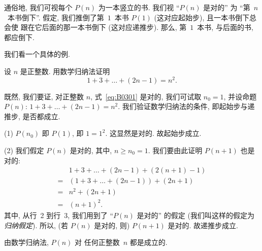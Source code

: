 \documentclass[../libro.tex]{subfiles}
\begin{document}
通俗地, 我们可视每个 \(P(n)\) 为一本竖立的书.
我们视 ``\(P(n)\) 是对的'' 为
``第~\(n\)~本书倒下''.
假定, 我们推倒了第~\(1\)~本书 \(P(1)\) (这对应起始步),
且一本书倒下总会使%
跟在它后面的那一本书倒下 (这对应递推步).
那么, 第~\(1\)~本书, 与后面的书,
都应倒下.

\vspace{2ex}

我们看一个具体的例.

\begin{example}
    设 \(n\) 是正整数.
    用数学归纳法证明
    \begin{equation}
        1 + 3 + \dots + (2n - 1) = n^2.
        \label{eq:B0301}
    \end{equation}

    既然, 我们要证, 对正整数 \(n\),
    式~\eqref{eq:B0301} 是对的,
    我们可试取 \(n_0 = 1\),
    并设命题 \(P(n)\): \(1 + 3 + \dots + (2n - 1) = n^2\).
    我们验证数学归纳法的条件,
    即起始步与递推步,
    是否都成立.

    (1)
    \(P(n_0)\) 即 \(P(1)\), 即 \(1 = 1^2\).
    这显然是对的.
    故起始步成立.

    (2)
    我们假定 \(P(n)\) 是对的, 其中, \(n \geq n_0 = 1\).
    我们要由此证明 \(P(n+1)\) 也是对的:
    \begin{align*}
        & 1 + 3 + \dots + (2n - 1) + (2(n+1) - 1)
        \\
        = {} & (1 + 3 + \dots + (2n - 1)) + (2n + 1)
        \\
        = {} & n^2 + (2n + 1)
        \\
        = {} & (n + 1)^2.
    \end{align*}
    其中, 从行~2 到行~3,
    我们用到了 ``\(P(n)\) 是对的'' 的假定
    (我们叫这样的假定为\emph{归纳假定}).
    所以, (若 \(P(n)\) 是对的, 则) \(P(n+1)\) 是对的.
    故递推步成立.

    由数学归纳法, \(P(n)\) 对%
    任何正整数~\(n\) 都是成立的.
\end{example}

\end{document}
